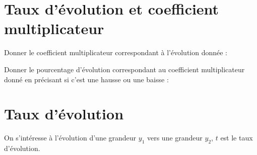 
\section{Taux d'évolution et coefficient multiplicateur}

\begin{questions}
	\question[3] Donner le coefficient multiplicateur correspondant à l'évolution donnée :
	
	
	\question[3] Donner le pourcentage d'évolution correspondant au coefficient multiplicateur donné en précisant si c'est une hausse ou une baisse :
	
\end{questions}

\newpage

\section{Taux d'évolution}
On s'intéresse à l'évolution d'une grandeur $y_1$ vers une grandeur $y_2$, $t$ est le taux d'évolution.

